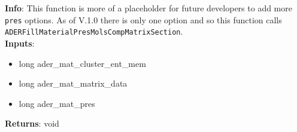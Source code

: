 \textbf{Info}: This function is more of a placeholder for future developers to
add more \texttt{pres} options. As of V.1.0 there is only one option
and so this function calls \texttt{ADERFillMaterialPresMolsCompMatrixSection}.\\

\noindent \textbf{Inputs}:
\begin{itemize}
\item{long ader\_mat\_cluster\_ent\_mem}
\item{long ader\_mat\_matrix\_data}
\item{long ader\_mat\_pres}
\end{itemize}

\noindent \textbf{Returns}: void
